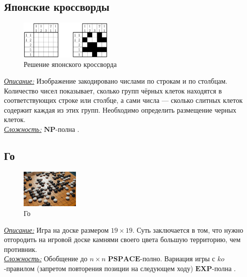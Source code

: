\documentclass{article}
\begin{document}
\vspace*{0.3in}

\subsection*{Японские кроссворды}

\begin{figure}
    \centering
    \includegraphics[width=0.4\textwidth]{nonogram.jpg}
    \caption{Решение японского кроссворда}
\end{figure}

\noindent\textit{\underline{Описание:}} Изображение закодировано числами по строкам и по столбцам. Количество чисел показывает, сколько групп чёрных клеток находятся в соответствующих строке или столбце, а сами числа — сколько слитных клеток содержит каждая из этих групп. Необходимо определить размещение черных клеток. \\

\noindent\textit{\underline{Сложность:}} $\mathbf{NP}$-полна \cite{nonograms}.

\vspace*{0.3in}

\subsection*{Го}

\begin{figure}
    \centering
    \includegraphics[width=0.25\textwidth]{go.jpeg}
    \caption{Го}
\end{figure}

\noindent\textit{\underline{Описание:}} Игра на доске размером $19\times19$.
Суть заключается в том, что нужно отгородить на игровой доске камнями своего цвета большую территорию, чем противник. \\

\noindent\textit{\underline{Сложность:}} Обобщение до $n \times n$ $\mathbf{PSPACE}$-полно. Вариация игры с $ko$-правилом (запретом повторения позиции на следующем ходу) $\mathbf{EXP}$-полна \cite{go}. 
\end{document}

